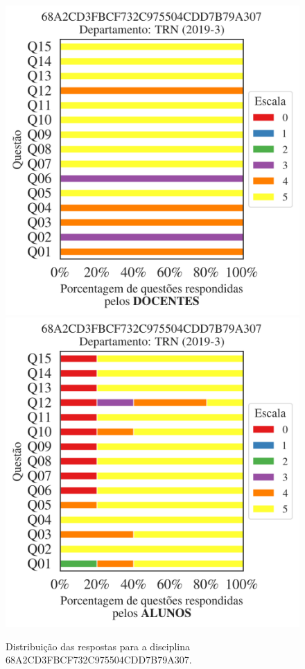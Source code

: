 \documentclass[a4paper,10pt]{article}
\begin{document}
\begin{figure}[h]
\centering
\includegraphics[width=0.485\linewidth]{analise_disciplina_departamento_TRN_68A2CD3FBCF732C975504CDD7B79A307_docentes.png}
\includegraphics[width=0.485\linewidth]{analise_disciplina_departamento_TRN_68A2CD3FBCF732C975504CDD7B79A307_alunos.png}
\caption{\label{fig:analise_geral_departamento}                Distribuição das respostas para a disciplina 68A2CD3FBCF732C975504CDD7B79A307. }
\end{figure}
\end{document}
